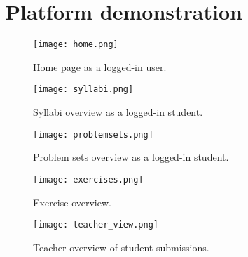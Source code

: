 \chapter{Platform demonstration} \label{chap:images}
\begin{figure}[H]
    \centering
    \texttt{[image: home.png]}
    \caption{Home page as a logged-in user.}
    \label{fig:Home page}
\end{figure}

\begin{figure}[H]
    \centering
    \texttt{[image: syllabi.png]}
    \caption{Syllabi overview as a logged-in student.}
    \label{fig:syllabi}
\end{figure}

\begin{figure}[H]
    \centering
    \texttt{[image: problemsets.png]}
    \caption{Problem sets overview as a logged-in student.}
    \label{fig:problemsets}
\end{figure}

\begin{figure}[H]
    \centering
    \texttt{[image: exercises.png]}
    \caption{Exercise overview.}
    \label{fig:exercise_overview}
\end{figure}

\begin{figure}[H]
    \centering
    \texttt{[image: teacher\_view.png]}
    \caption{Teacher overview of student submissions.}
    \label{fig:teacher_overview.}
\end{figure}